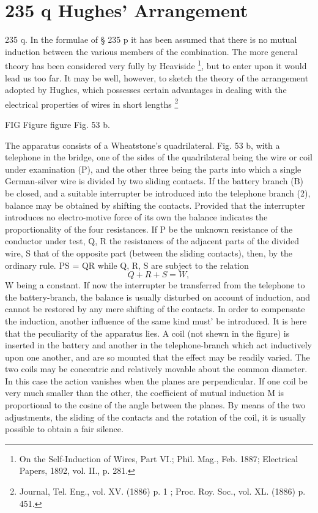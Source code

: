 \section{235 q Hughes' Arrangement}
235 q. In the formulae of § 235 p it has been assumed that there is no mutual
induction between the various members of the combination. The more general
theory has been considered very fully by Heaviside
\footnote{On the Self-Induction of Wires, Part VI.; Phil. Mag., Feb. 1887;
Electrical Papers, 1892, vol. II., p. 281.}, but to enter upon it would
lead us too far.  It may be well, however, to sketch the theory of the
arrangement adopted by Hughes, which possesses certain advantages in dealing
with the electrical properties of wires in short lengths \footnote{Journal, Tel.
Eng., vol. XV. (1886) p. 1 ; Proc. Roy. Soc., vol. XL. (1886) p.  451.}

FIG Figure figure Fig. 53 b.

The apparatus consists of a Wheatstone’s quadrilateral. Fig. 53 b, with a
telephone in the bridge, one of the sides of the quadrilateral being the wire
or coil under examination (P), and the other three being the parts into which a
single German-silver wire is divided by two sliding contacts. If the battery
branch (B) be closed, and a suitable interrupter be introduced into the
telephone branch (2), balance may be obtained by shifting the contacts. Provided
that the interrupter introduces no electro-motive force of its own  the balance
indicates the proportionality
of the four resistances. If P be the unknown resistance of the conductor under
test, Q, R the resistances of the adjacent parts of the divided wire, S that of
the opposite part (between the sliding contacts), then, by the ordinary rule.
PS = QR while Q, R, S are subject to the relation
\[Q + R + S= W,\]
W being a constant. If now the interrupter be transferred from the telephone
to the battery-branch, the balance is usually disturbed on account of
induction, and cannot be restored by any mere shifting of the contacts. In
order to compensate the induction, another influence of the same kind must'
be introduced. It is here that the peculiarity of the apparatus lies. A coil
(not shewn in the figure) is inserted in the battery and another in the
telephone-branch which act inductively upon one another, and are so mounted
that the effect may be readily varied. The two coils may be concentric and
relatively movable about the common diameter. In this case the action vanishes
when the planes are perpendicular. If one coil be very much smaller than the
other, the coefficient of mutual induction M is proportional to the cosine of
the angle between the planes. By means of the two adjustments, the sliding of
the contacts and the rotation of the coil, it is usually possible to obtain a
fair silence.

